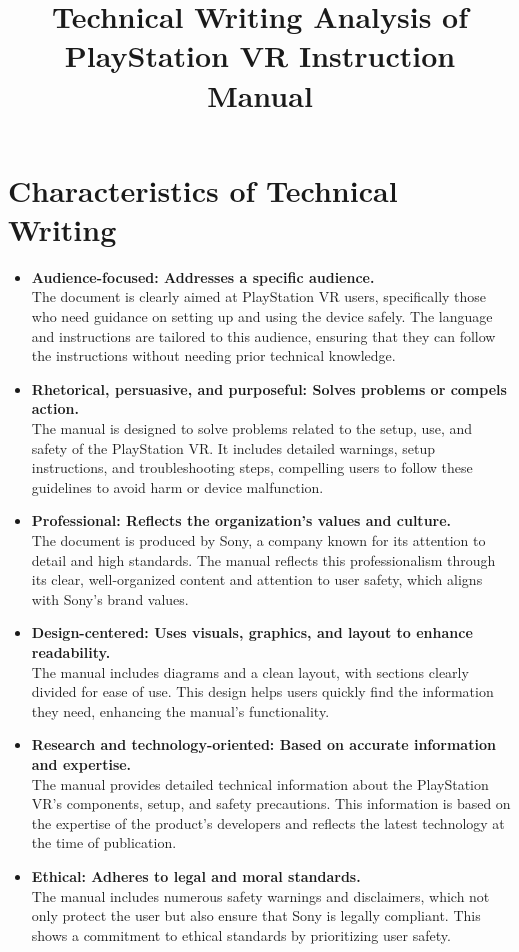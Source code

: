 \documentclass{article}
\title{Technical Writing Analysis of PlayStation VR Instruction Manual}
\author{}
\date{}
\begin{document}
\maketitle

\section*{Characteristics of Technical Writing}

\begin{itemize}
    \item \textbf{Audience-focused: Addresses a specific audience.} \\
    The document is clearly aimed at PlayStation VR users, specifically those who need guidance on setting up and using the device safely. The language and instructions are tailored to this audience, ensuring that they can follow the instructions without needing prior technical knowledge.

    \item \textbf{Rhetorical, persuasive, and purposeful: Solves problems or compels action.} \\
    The manual is designed to solve problems related to the setup, use, and safety of the PlayStation VR. It includes detailed warnings, setup instructions, and troubleshooting steps, compelling users to follow these guidelines to avoid harm or device malfunction.

    \item \textbf{Professional: Reflects the organization's values and culture.} \\
    The document is produced by Sony, a company known for its attention to detail and high standards. The manual reflects this professionalism through its clear, well-organized content and attention to user safety, which aligns with Sony’s brand values.

    \item \textbf{Design-centered: Uses visuals, graphics, and layout to enhance readability.} \\
    The manual includes diagrams and a clean layout, with sections clearly divided for ease of use. This design helps users quickly find the information they need, enhancing the manual's functionality.

    \item \textbf{Research and technology-oriented: Based on accurate information and expertise.} \\
    The manual provides detailed technical information about the PlayStation VR’s components, setup, and safety precautions. This information is based on the expertise of the product's developers and reflects the latest technology at the time of publication.

    \item \textbf{Ethical: Adheres to legal and moral standards.} \\
    The manual includes numerous safety warnings and disclaimers, which not only protect the user but also ensure that Sony is legally compliant. This shows a commitment to ethical standards by prioritizing user safety.
\end{itemize}
\end{document}
